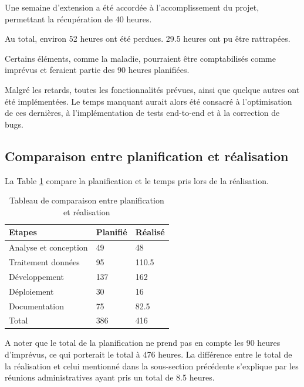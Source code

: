 \documentclass[
    iai, %
    il, %
]{heig-tb}
\begin{document}
Une semaine d'extension a été accordée à l'accomplissement du projet, permettant la récupération de 40 heures.

Au total, environ 52 heures ont été perdues. 29.5 heures ont pu être rattrapées.

Certains éléments, comme la maladie, pourraient être comptabilisés comme imprévus et feraient partie des 90 heures planifiées.

Malgré les retards, toutes les fonctionnalités prévues, ainsi que quelque autres ont été implémentées.
Le temps manquant aurait alors été consacré à l'optimisation de ces dernières, à l'implémentation de tests end-to-end et à la correction de bugs.

\subsection{Comparaison entre planification et réalisation}

La Table \ref{temps} compare la planification et le temps pris lors de la réalisation.

\begin{table}[h]
    \begin{center}
        \begin{tabular}{l|l|l}
            Etapes                & Planifié & Réalisé \\ \hline
            Analyse et conception & 49       & 48      \\
            Traitement données    & 95       & 110.5   \\
            Développement         & 137      & 162     \\
            Déploiement           & 30       & 16      \\
            Documentation         & 75       & 82.5    \\ \hline
            Total                 & 386      & 416
        \end{tabular}
        \caption{Tableau de comparaison entre planification et réalisation \label{temps}}
    \end{center}
\end{table}

A noter que le total de la planification ne prend pas en compte les 90 heures d'imprévus, ce qui porterait le total à 476 heures.
La différence entre le total de la réalisation et celui mentionné dans la sous-section précédente s'explique par les réunions administratives ayant pris un total de 8.5 heures.
\end{document}

